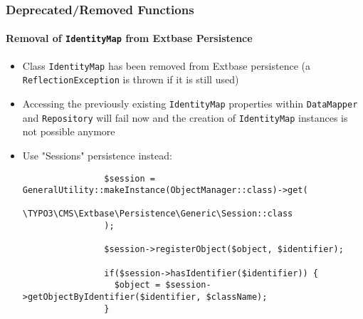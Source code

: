 
\begin{frame}[fragile]
	\frametitle{Deprecated/Removed Functions}
	\framesubtitle{Removal of \texttt{IdentityMap} from Extbase Persistence}

	\lstset{basicstyle=\tiny\ttfamily}

	\begin{itemize}

		\item Class \texttt{IdentityMap} has been removed from Extbase persistence\newline
			\small(a \texttt{ReflectionException} is thrown if it is still used)\normalsize

		\item Accessing the previously existing \texttt{IdentityMap} properties within
			\texttt{DataMapper} and \texttt{Repository} will fail now and the creation of
			\texttt{IdentityMap} instances is not possible anymore

		\item Use "Sessions" persistence instead:

			\begin{lstlisting}
				$session = GeneralUtility::makeInstance(ObjectManager::class)->get(
				  \TYPO3\CMS\Extbase\Persistence\Generic\Session::class
				);

				$session->registerObject($object, $identifier);

				if($session->hasIdentifier($identifier)) {
				  $object = $session->getObjectByIdentifier($identifier, $className);
				}
			\end{lstlisting}

	\end{itemize}

\end{frame}


